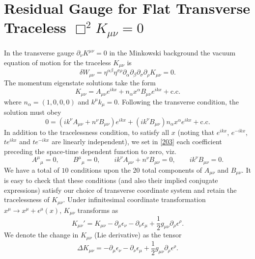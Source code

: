 \documentclass[10pt,letterpaper]{article}
\numberwithin{equation}{subsection}
\begin{document}
\section{Residual Gauge for Flat Transverse Traceless $\Box^2 K_{\mu\nu}=0$}
\label{resgauge}
In the transverse gauge $\partial_\nu K^{\mu\nu} = 0$ in the Minkowski background the vacuum equation of motion for the traceless $K_{\mu\nu}$ is
\begin{equation}
\delta W_{\mu\nu} = \eta^{\alpha\beta} \eta^{\sigma\rho}\partial_\alpha\partial_\beta\partial_\sigma\partial_\rho K_{\mu\nu} =0.
\end{equation}
The momentum eigenstate solutions take the form 
\begin{equation}
K_{\mu\nu} = A_{\mu\nu}e^{ikx} + n_\alpha x^\alpha B_{\mu\nu} e^{ikx} +\text{c.c.}\label{202}
\end{equation}
where $n_\alpha = (1,0,0,0)$ and $k^\mu k_{\mu} = 0$. Following the transverse condition, the solution must obey
\begin{equation}
0=\left(ik^\nu A_{\mu\nu} + n^\nu B_{\mu\nu}\right)e^{ikx}
+ \left( ik^\nu B_{\mu\nu}\right) n_\alpha x^\alpha  e^{ikx}+ \text{c.c.}\label{203}
\end{equation}
In addition to the tracelessness condition, to satisfy all $x$ (noting that $e^{ikx}$, $e^{-ikx}$, $te^{ikx}$ and $te^{-ikx}$ are linearly independent), we set in \eqref{203} each coefficient preceding the space-time dependent function to zero, viz.
\begin{equation}
A^\mu{}_\mu = 0,\qquad B^\mu{}_\mu=0,\qquad ik^\nu A_{\mu\nu} + n^\nu B_{\mu\nu}= 0,\qquad i k^\nu B_{\mu\nu} = 0.
\end{equation}
We have a total of $10$ conditions upon the 20 total components of $A_{\mu\nu}$ and $B_{\mu\nu}$. 
It is easy to check that these conditions (and also their implied conjugate expressions) satisfy our choice of transverse coordinate system and retain the tracelessness of $K_{\mu\nu}$. 
Under infinitesimal coordinate transformation $x^\mu \to x^\mu + \epsilon^\mu(x)$, $K_{\mu\nu}$ transforms as
\begin{equation}
	K_{\mu\nu}' = K_{\mu\nu} - \partial_\mu \epsilon_\nu - \partial_\nu\epsilon_\mu + \frac12 g_{\mu\nu} \partial_\rho \epsilon^\rho.
\end{equation}
We denote the change in $K_{\mu\nu}$ (Lie derivative) as the tensor
\begin{equation}
\Delta K_{\mu\nu} = - \partial_\mu \epsilon_\nu - \partial_\nu\epsilon_\mu + \frac12 g_{\mu\nu} \partial_\rho \epsilon^\rho.\label{207}
\end{equation}
\end{document}
